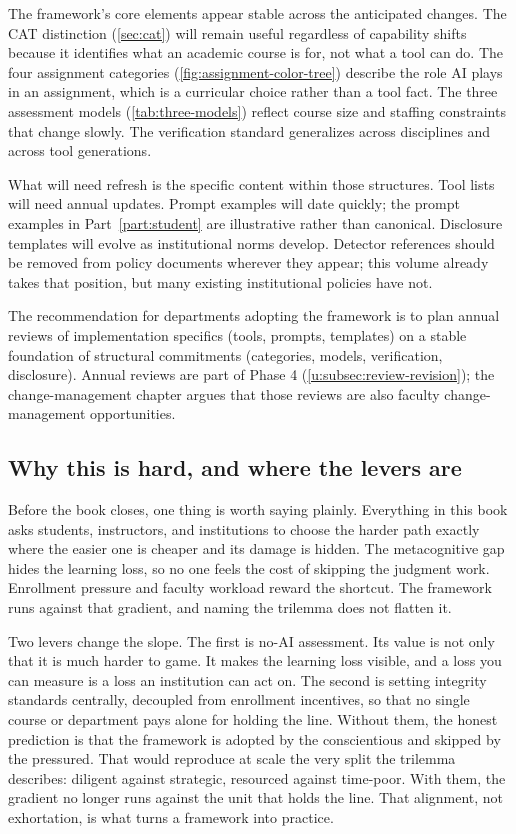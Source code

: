 \documentclass{SIAMbook2023}
\begin{document}
The framework's core elements appear stable across the anticipated changes. The CAT distinction (\cref{sec:cat}) will remain useful regardless of capability shifts because it identifies what an academic course is for, not what a tool can do. The four assignment categories (\cref{fig:assignment-color-tree}) describe the role AI plays in an assignment, which is a curricular choice rather than a tool fact. The three assessment models (\cref{tab:three-models}) reflect course size and staffing constraints that change slowly. The verification standard generalizes across disciplines and across tool generations.

What will need refresh is the specific content within those structures. Tool lists will need annual updates. Prompt examples will date quickly; the prompt examples in Part~\ref{part:student} are illustrative rather than canonical. Disclosure templates will evolve as institutional norms develop. Detector references should be removed from policy documents wherever they appear; this volume already takes that position, but many existing institutional policies have not.

The recommendation for departments adopting the framework is to plan annual reviews of implementation specifics (tools, prompts, templates) on a stable foundation of structural commitments (categories, models, verification, disclosure). Annual reviews are part of Phase 4 (\cref{u:subsec:review-revision}); the change-management chapter argues that those reviews are also faculty change-management opportunities.

\subsection{Why this is hard, and where the levers are}
\label{u:subsec:leverage}

Before the book closes, one thing is worth saying plainly. Everything in this book asks students, instructors, and institutions to choose the harder path exactly where the easier one is cheaper and its damage is hidden. The metacognitive gap hides the learning loss, so no one feels the cost of skipping the judgment work. Enrollment pressure and faculty workload reward the shortcut. The framework runs against that gradient, and naming the trilemma does not flatten it.

Two levers change the slope. The first is no-AI assessment. Its value is not only that it is much harder to game. It makes the learning loss visible, and a loss you can measure is a loss an institution can act on. The second is setting integrity standards centrally, decoupled from enrollment incentives, so that no single course or department pays alone for holding the line. Without them, the honest prediction is that the framework is adopted by the conscientious and skipped by the pressured. That would reproduce at scale the very split the trilemma describes: diligent against strategic, resourced against time-poor. With them, the gradient no longer runs against the unit that holds the line. That alignment, not exhortation, is what turns a framework into practice.
\end{document}
